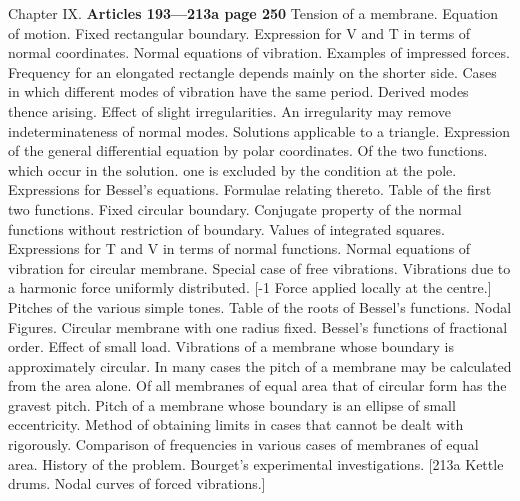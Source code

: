 Chapter IX. \textbf{Articles 193—213a page 250}
Tension of a membrane. Equation of motion. Fixed rectangular boundary.
Expression for V and T in terms of normal coordinates. Normal equations of
vibration. Examples of impressed forces. Frequency for an elongated rectangle
depends mainly on the shorter side. Cases in which different modes of vibration
have the same period. Derived modes thence arising. Effect of slight
irregularities. An irregularity may remove indeterminateness of normal modes.
Solutions applicable to a triangle. Expression of the general differential
equation by polar coordinates. Of the two functions. which occur in the
solution. one is excluded by the condition at the pole. Expressions for
Bessel’s equations. Formulae relating thereto. Table of the first two
functions.  Fixed circular boundary. Conjugate property of the normal functions
without restriction of boundary. Values of integrated squares. Expressions for
T and V in terms of normal functions. Normal equations of vibration for
circular membrane. Special case of free vibrations. Vibrations due to a
harmonic force uniformly distributed.
[-1 Force applied locally at the centre.]
Pitches of the various simple tones.
Table of the roots of Bessel’s functions. Nodal Figures. Circular membrane with
one radius fixed.  Bessel’s functions of fractional order. Effect of small
load. Vibrations of a membrane whose boundary is approximately circular. In
many cases the pitch of a membrane may be calculated from the area alone.  Of
all membranes of equal area that of circular form has the gravest pitch. Pitch
of a membrane whose boundary is an ellipse of small eccentricity. Method of
obtaining limits in cases that cannot be dealt with rigorously. Comparison of
frequencies in various cases of membranes of equal area. History of the
problem. Bourget’s experimental investigations.
[213a Kettle drums. Nodal curves of forced vibrations.]


